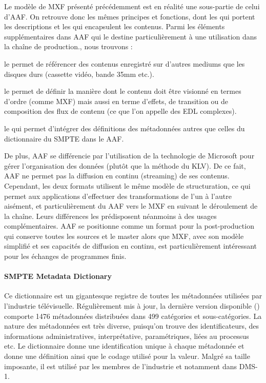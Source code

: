 Le modèle de MXF présenté précédemment est en réalité une sous-partie de celui d'AAF. 
On retrouve donc les mêmes principes et fonctions, dont les  qui portent les descriptions et les  qui encapsulent les contenus. 
Parmi les éléments supplémentaires dans AAF qui le destine particulièrement à une utilisation dans la chaîne de production., nous trouvons :
\begin{liste}
	\item le  permet de référencer des contenus enregistré sur d'autres mediums que les disques durs (cassette vidéo, bande 35mm etc.).

	\item le  permet de définir la manière dont le contenu doit être visionné en termes d'ordre (comme MXF) mais aussi en terme d'effets, de transition ou de composition des flux de contenu (ce que l'on appelle des EDL complexes).
	
	\item le  qui permet d'intégrer des définitions des métadonnées autres que celles du dictionnaire du SMPTE dans le AAF.
\end{liste}

De plus, AAF se différencie par l'utilisation de la technologie  de Microsoft pour gérer l'organisation des données (plutôt que la méthode du KLV).
De ce fait, AAF ne permet pas la diffusion en continu (streaming) de ses contenus.
Cependant, les deux formats utilisent le même modèle de structuration, ce qui permet aux applications d'effectuer des transformations de l'un à l'autre aisément, et particulièrement du AAF vers le MXF en suivant le déroulement de la chaîne.
Leurs différences les prédisposent néanmoins à des usages complémentaires. 
AAF se positionne comme un format pour la post-production qui conserve toutes les sources et le master alors que MXF, avec son modèle simplifié et ses capacités de diffusion en continu, est particulièrement intéressant pour les échanges de programmes finis.


\paragraph{SMPTE Metadata Dictionary}
Ce dictionnaire est un gigantesque registre de toutes les métadonnées utilisées par l'industrie télévisuelle. 
Régulièrement mis à jour, la dernière version disponible (\cite{SMPTE2010}) comporte 1476 métadonnées distribuées dans 499 catégories et sous-catégories.
La nature des métadonnées est très diverse, puisqu'on trouve des identificateurs, des informations administratives, interprétative, paramétriques, liées au processus etc.
Le dictionnaire donne une identification unique à chaque métadonnée et donne une définition ainsi que le codage utilisé pour la valeur. 
Malgré sa taille imposante, il est utilisé par les membres de l'industrie et notamment dans DMS-1.




